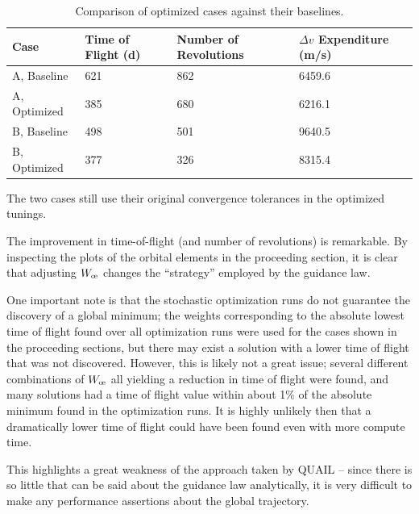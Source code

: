 \begin{table}[H]
    \centering
    \begin{tabular}{L{5cm}L{2.5cm}L{2.5cm}L{3cm}}
        \toprule
        \textbf{Case}                          & Time of Flight (d) & Number of Revolutions & \(\Delta v\) Expenditure (m/s) \\
        \midrule
        A, Baseline                            & 621                & 862                   & 6459.6                         \\
        A, Optimized  & 385                & 680                   & 6216.1                         \\
        B, Baseline                            & 498                & 501                   & 9640.5                         \\
         B, Optimized & 377                & 326                   & 8315.4                         \\
        \bottomrule
    \end{tabular}
    \caption{Comparison of optimized cases against their baselines.}
    \label{tab:outputs_2_summary}
\end{table}

The two cases still use their original convergence tolerances in the optimized tunings.

The improvement in time-of-flight (and number of revolutions) is remarkable. By inspecting the plots of the orbital elements in the proceeding section, it is clear that adjusting \(W_\moe\) changes the ``strategy'' employed by the guidance law.

One important note is that the stochastic optimization runs do not guarantee the discovery of a global minimum; the weights corresponding to the absolute lowest time of flight found over all optimization runs were used for the cases shown in the proceeding sections, but there may exist a solution with a lower time of flight that was not discovered. However, this is likely not a great issue; several different combinations of \(W_\moe\) all yielding a reduction in time of flight were found, and many solutions had a time of flight value within about 1\% of the absolute minimum found in the optimization runs. It is highly unlikely then that a dramatically lower time of flight could have been found even with more compute time.

This highlights a great weakness of the approach taken by QUAIL -- since there is so little that can be said about the guidance law analytically, it is very difficult to make any performance assertions about the global trajectory.

